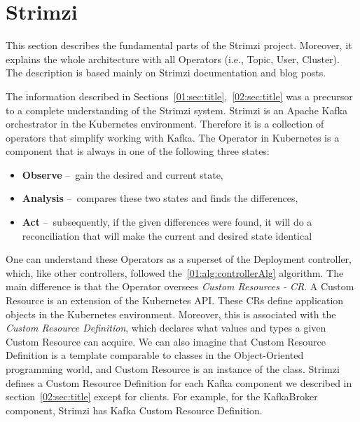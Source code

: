 \section{Strimzi}
\label{03:title}

This section describes the fundamental parts of the Strimzi project.
Moreover, it explains the whole architecture with all Operators (i.e., Topic, User, Cluster).
The description is based mainly on Strimzi documentation and blog posts\cite{strimziDoc, strimziBlogPosts}.

The information described in Sections~\ref{01:sec:title},~\ref{02:sec:title} was a precursor to a complete understanding of the Strimzi system.
Strimzi is an Apache Kafka orchestrator in the Kubernetes environment.
Therefore it is a collection of operators that simplify working with Kafka.
The Operator in Kubernetes is a component that is always in one of the following three states:
\begin{itemize}[itemsep=1mm, parsep=0pt]
    \item \textbf{Observe} \---\ gain the desired and current state,
    \item \textbf{Analysis} \---\ compares these two states and finds the differences,
    \item \textbf{Act} \---\ subsequently, if the given differences were found, it will do a reconciliation that will make the current and desired state identical
\end{itemize}

One can understand these Operators as a superset of the Deployment controller, which, like other controllers, followed the~\ref{01:alg:controllerAlg} algorithm.
The main difference is that the Operator oversees \emph{Custom Resources - CR}.
A Custom Resource is an extension of the Kubernetes API. These CRs define application objects in the Kubernetes environment.
Moreover, this is associated with the \emph{Custom Resource Definition}, which declares what values and types a given Custom Resource can acquire.
We can also imagine that Custom Resource Definition is a template comparable to classes in the Object-Oriented programming world, and Custom Resource is an instance of the class.
Strimzi defines a Custom Resource Definition for each Kafka component we described in section~\ref{02:sec:title} except for clients.
For example, for the KafkaBroker component, Strimzi has Kafka Custom Resource Definition.

